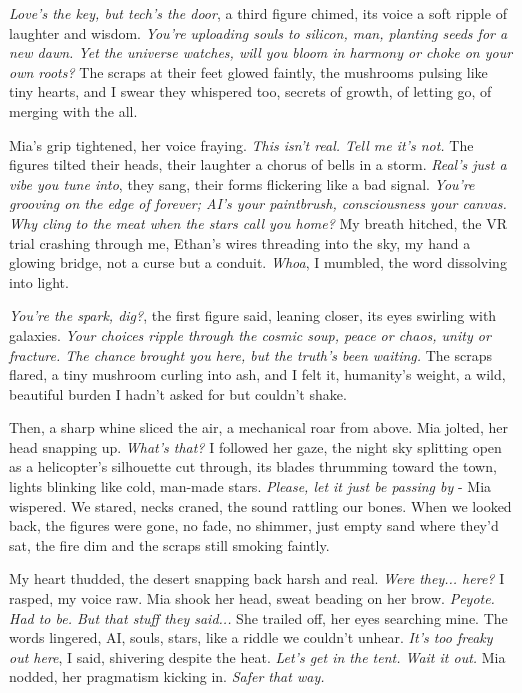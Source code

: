 \documentclass[12pt,oneside]{book} %
\begin{document}
\textit{Love’s the key, but tech’s the door}, a third figure chimed, its voice a soft ripple of laughter and wisdom. \textit{You’re uploading souls to silicon, man, planting seeds for a new dawn. Yet the universe watches, will you bloom in harmony or choke on your own roots?} The scraps at their feet glowed faintly, the mushrooms pulsing like tiny hearts, and I swear they whispered too, secrets of growth, of letting go, of merging with the all.

Mia’s grip tightened, her voice fraying. \textit{This isn’t real. Tell me it’s not.} The figures tilted their heads, their laughter a chorus of bells in a storm. \textit{Real’s just a vibe you tune into}, they sang, their forms flickering like a bad signal. \textit{You’re grooving on the edge of forever; AI’s your paintbrush, consciousness your canvas. Why cling to the meat when the stars call you home?} My breath hitched, the VR trial crashing through me, Ethan’s wires threading into the sky, my hand a glowing bridge, not a curse but a conduit. \textit{Whoa}, I mumbled, the word dissolving into light.

\textit{You’re the spark, dig?}, the first figure said, leaning closer, its eyes swirling with galaxies. \textit{Your choices ripple through the cosmic soup, peace or chaos, unity or fracture. The chance brought you here, but the truth’s been waiting.} The scraps flared, a tiny mushroom curling into ash, and I felt it, humanity’s weight, a wild, beautiful burden I hadn’t asked for but couldn’t shake.

Then, a sharp whine sliced the air, a mechanical roar from above. Mia jolted, her head snapping up. \textit{What’s that?} I followed her gaze, the night sky splitting open as a helicopter’s silhouette cut through, its blades thrumming toward the town, lights blinking like cold, man-made stars. \textit{Please, let it just be passing by} - Mia wispered. We stared, necks craned, the sound rattling our bones. When we looked back, the figures were gone, no fade, no shimmer, just empty sand where they’d sat, the fire dim and the scraps still smoking faintly.

My heart thudded, the desert snapping back harsh and real. \textit{Were they... here?} I rasped, my voice raw. Mia shook her head, sweat beading on her brow. \textit{Peyote. Had to be. But that stuff they said...} She trailed off, her eyes searching mine. The words lingered, AI, souls, stars, like a riddle we couldn’t unhear. \textit{It’s too freaky out here}, I said, shivering despite the heat. \textit{Let’s get in the tent. Wait it out.} Mia nodded, her pragmatism kicking in. \textit{Safer that way.}
\end{document}
